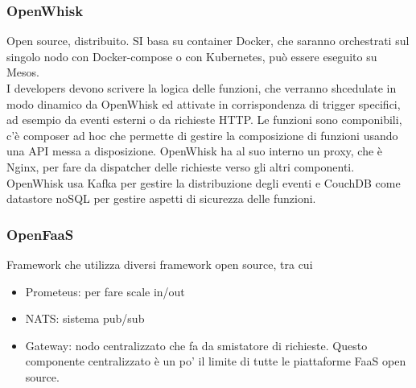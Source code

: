\documentclass{article}
\begin{document}
\subsubsection{OpenWhisk}
Open source, distribuito. SI basa su container Docker, che saranno orchestrati sul singolo nodo con Docker-compose o con Kubernetes, può essere eseguito su Mesos.\\ I developers devono scrivere la logica delle funzioni, che verranno shcedulate in modo dinamico da OpenWhisk ed attivate in corrispondenza di trigger specifici, ad esempio da eventi esterni o da richieste HTTP. Le funzioni sono componibili, c'è composer ad hoc che permette di gestire la composizione di funzioni usando una API messa a disposizione. OpenWhisk ha al suo interno un proxy, che è Nginx, per fare da dispatcher delle richieste verso gli altri componenti. OpenWhisk usa Kafka per gestire la distribuzione degli eventi e CouchDB come datastore noSQL per gestire aspetti di sicurezza delle funzioni.
\subsubsection{OpenFaaS}
Framework che utilizza diversi framework open source, tra cui
\begin{itemize}
\item Prometeus: per fare scale in/out
\item NATS: sistema pub/sub
\item Gateway: nodo centralizzato che fa da smistatore di richieste. Questo componente centralizzato è un po' il limite di tutte le piattaforme FaaS open source.
\end{itemize}
\end{document}
